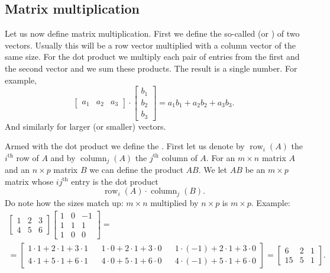 \subsection{Matrix multiplication}

Let us now define matrix multiplication.  First we define the so-called
\emph{} (or \emph{}) of two vectors.
Usually this will be a row vector multiplied
with a column vector of the same size.  For the dot product we multiply
each pair of entries from the first and the second vector and we sum these
products.  The result is a single number.
For example,
\begin{equation*}
\begin{bmatrix}
a_1 & a_2 & a_3
\end{bmatrix}
\cdot
\begin{bmatrix}
b_1 \\
b_2 \\
b_3
\end{bmatrix}
= a_1 b_1 + a_2 b_2 + a_3 b_3 .
\end{equation*}
And similarly for larger (or smaller) vectors.

Armed with the dot product we define the
\emph{}.
First let us denote by $\operatorname{row}_i(A)$ the $i^{\text{th}}$ row
of $A$ and by
$\operatorname{column}_j(A)$ the $j^{\text{th}}$ column of $A$.
For an $m \times n$ matrix $A$ and an $n \times p$ matrix $B$
we can define the product $AB$.  We let $AB$ be an $m \times p$
matrix whose $ij^{\text{th}}$ entry is the dot product
\begin{equation*}
\operatorname{row}_i(A) \cdot
\operatorname{column}_j(B) .
\end{equation*}
Do note how the sizes match up: $m \times n$ multiplied by $n \times p$ is 
$m \times p$.  Example:
\begin{multline*}
\begin{bmatrix}
1 & 2 & 3 \\
4 & 5 & 6
\end{bmatrix}
\begin{bmatrix}
1 & 0 & -1 \\
1 & 1 & 1 \\
1 & 0 & 0
\end{bmatrix}
= \\ =
\begin{bmatrix}
1\cdot 1 + 2\cdot 1 + 3 \cdot 1 &  &
1\cdot 0 + 2\cdot 1 + 3 \cdot 0 &  &
1\cdot (-1) + 2\cdot 1 + 3 \cdot 0 \\
4\cdot 1 + 5\cdot 1 + 6 \cdot 1 &  &
4\cdot 0 + 5\cdot 1 + 6 \cdot 0 &  &
4\cdot (-1) + 5\cdot 1 + 6 \cdot 0
\end{bmatrix}
=
\begin{bmatrix}
6 & 2 & 1 \\
15 & 5 & 1
\end{bmatrix}.
\end{multline*}

